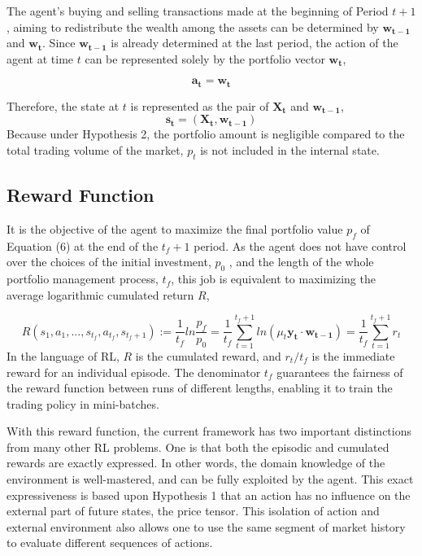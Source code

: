 \documentclass[journal,onecolumn]{IEEEtran}
\newcommand{\vc}[1]{\mathbf{#1}}
\begin{document}
The agent’s buying and selling transactions made at the beginning of Period $t + 1$, aiming to redistribute the wealth among the assets can be determined by $\vc{w_{t-1}}$ and $\vc{w_{t}}$. Since $\vc{w_{t-1}}$ is already determined at the last period, the action of the agent at time $t$ can be represented solely by the portfolio vector $\vc{w_{t}}$,

\begin{equation}
	\vc{a_t} = \vc{w_{t}}
\end{equation}

Therefore, the state at $t$ is represented as the pair of $\vc{X_t}$ and $\vc{w_{t-1}}$,
\begin{equation}
	\vc{s_t} = (\vc{X_t}, \vc{w_{t-1}})
\end{equation}
Because under Hypothesis 2, the portfolio
amount is negligible compared to the total trading volume of the market, $p_t$ is not included in the internal state.

\subsection{Reward Function}
It is the objective of the agent to maximize the final portfolio value $p_f$ of Equation (6) at the
end of the $t_f + 1$ period. As the agent does not have control over the choices of the initial investment, $p_0$ , and the length of the whole portfolio management process, $t_f$, this job is equivalent to maximizing the average logarithmic cumulated return $R$,

\begin{equation}
	R(s_1, a_1,..., s_{t_f} , a_{t_f} , s_{t_f +1} ) := \frac{1}{t_f}ln\frac{p_f}{p_0} = \frac{1}{t_f}\sum_{t=1}^{t_f+1}ln(\mu_t \vc{y_t}\cdot\vc{w_{t-1}})=\frac{1}{t_f}\sum_{t=1}^{t_f+1}r_t
\end{equation}
In the language of RL, $R$ is the cumulated reward, and $r_t /t_f$ is the immediate reward for an individual episode. The denominator $t_f$ guarantees the fairness of the reward function between runs of different lengths, enabling it to train the trading policy in mini-batches.

With this reward function, the current framework has two important distinctions from many other RL problems. One is that both the episodic and cumulated rewards are exactly
expressed. In other words, the domain knowledge of the environment is well-mastered, and can be fully exploited by the agent. This exact expressiveness is based upon Hypothesis
1 that an action has no influence on the external part of future states, the price tensor. This isolation of action and external environment also allows one to use the same segment of market history to evaluate different sequences of actions.
\end{document}
